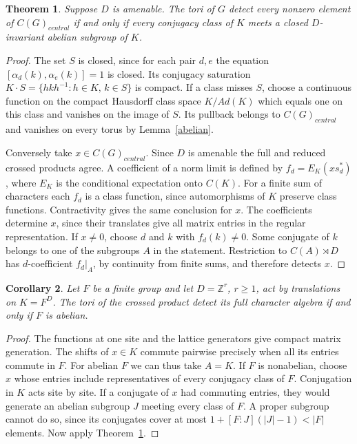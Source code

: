 \documentclass[11pt,a4paper]{article}
\newtheorem{thm}{Theorem}[section]
\newtheorem{cor}[thm]{Corollary}
\theoremstyle{remark}
\begin{document}
\begin{thm}\label{classcriterion}
Suppose $D$ is amenable. The tori of $G$ detect every nonzero element of
$C(G)_{central}$ if and only if every conjugacy class of $K$ meets a closed
$D$-invariant abelian subgroup of $K$.
\end{thm}
\begin{proof}
The set $S$ is closed, since for each pair $d,e$ the equation
$[\alpha_d(k),\alpha_e(k)]=1$ is closed. Its conjugacy saturation
$K\cdot S=\{hkh^{-1}:h\in K,\,k\in S\}$ is compact. If a class misses
$S$, choose a continuous function on the compact Hausdorff class space
$K/Ad(K)$ which equals one on this class and vanishes on the
image of $S$. Its pullback belongs to $C(G)_{central}$ and vanishes on every
torus by Lemma~\ref{abelian}.

Conversely take $x\in C(G)_{central}$. Since $D$ is amenable the full and reduced
crossed products agree. A coefficient of a norm limit is defined by
$f_d=E_K(xs_d^*)$, where $E_K$ is the conditional expectation onto $C(K)$.
For a finite sum of characters each $f_d$ is a class function, since
automorphisms of $K$ preserve class functions. Contractivity gives the
same conclusion for $x$. The coefficients determine $x$, since their
translates give all matrix entries in the regular representation.
If $x\ne0$, choose $d$ and $k$ with $f_d(k)\ne0$. Some
conjugate of $k$ belongs to one of the subgroups $A$ in the statement.
Restriction to $C(A)\rtimes D$ has $d$-coefficient $f_d|_A$, by
continuity from finite sums, and therefore detects $x$.
\end{proof}

\begin{cor}\label{shiftcharacters}
Let $F$ be a finite group and let $D=\mathbb Z^r$, $r\ge1$, act by
translations on $K=F^D$. The tori of the crossed product detect its full
character algebra if and only if $F$ is abelian.
\end{cor}
\begin{proof}
The functions at one site and the lattice generators give compact matrix
generation. The shifts of $x\in K$ commute pairwise precisely when all
its entries commute in $F$. For abelian $F$ we can thus take $A=K$.
If $F$ is nonabelian, choose $x$ whose entries include representatives
of every conjugacy class of $F$. Conjugation in $K$ acts site by site.
If a conjugate of $x$ had commuting entries, they would generate an
abelian subgroup $J$ meeting every class of $F$. A proper subgroup
cannot do so, since its conjugates cover at most
$1+[F:J](|J|-1)<|F|$ elements. Now apply Theorem~\ref{classcriterion}.
\end{proof}
\end{document}
